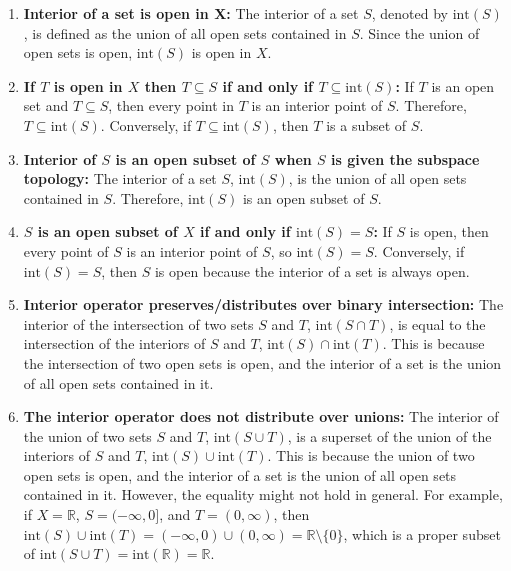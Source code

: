 \documentclass[
]{book}
\theoremstyle{definition}
\theoremstyle{definition}
\theoremstyle{definition}
\theoremstyle{definition}
\theoremstyle{remark}
\begin{document}
\begin{enumerate}
\def\labelenumi{\alph{enumi}.}
\item
  \textbf{Interior of a set is open in X:} The interior of a set \(S\), denoted by \(\text{int}(S)\), is defined as the union of all open sets contained in \(S\). Since the union of open sets is open, \(\text{int}(S)\) is open in \(X\).
\item
  \textbf{If \(T\) is open in \(X\) then \(T \subseteq S\) if and only if \(T \subseteq \text{int}(S)\):} If \(T\) is an open set and \(T \subseteq S\), then every point in \(T\) is an interior point of \(S\). Therefore, \(T \subseteq \text{int}(S)\). Conversely, if \(T \subseteq \text{int}(S)\), then \(T\) is a subset of \(S\).
\item
  \textbf{Interior of \(S\) is an open subset of \(S\) when \(S\) is given the subspace topology:} The interior of a set \(S\), \(\text{int}(S)\), is the union of all open sets contained in \(S\). Therefore, \(\text{int}(S)\) is an open subset of \(S\).
\item
  \textbf{\(S\) is an open subset of \(X\) if and only if \(\text{int}(S) = S\):} If \(S\) is open, then every point of \(S\) is an interior point of \(S\), so \(\text{int}(S) = S\). Conversely, if \(\text{int}(S) = S\), then \(S\) is open because the interior of a set is always open.
\item
  \textbf{Interior operator preserves/distributes over binary intersection:} The interior of the intersection of two sets \(S\) and \(T\), \(\text{int}(S \cap T)\), is equal to the intersection of the interiors of \(S\) and \(T\), \(\text{int}(S) \cap \text{int}(T)\). This is because the intersection of two open sets is open, and the interior of a set is the union of all open sets contained in it.
\item
  \textbf{The interior operator does not distribute over unions:} The interior of the union of two sets \(S\) and \(T\), \(\text{int}(S \cup T)\), is a superset of the union of the interiors of \(S\) and \(T\), \(\text{int}(S) \cup \text{int}(T)\). This is because the union of two open sets is open, and the interior of a set is the union of all open sets contained in it. However, the equality might not hold in general. For example, if \(X = \mathbb{R}\), \(S = (-\infty, 0]\), and \(T = (0, \infty)\), then \(\text{int}(S) \cup \text{int}(T) = (-\infty, 0) \cup (0, \infty) = \mathbb{R} \setminus \{0\}\), which is a proper subset of \(\text{int}(S \cup T) = \text{int}(\mathbb{R}) = \mathbb{R}\).
\end{enumerate}
\end{document}

